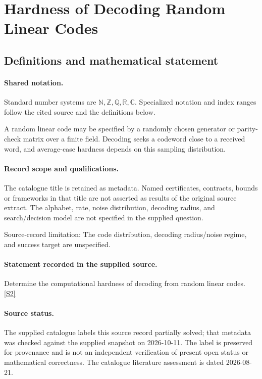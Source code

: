 \documentclass[11pt]{article}
\newcommand{\sref}[2]{\hyperlink{source:#1:#2}{[S#2]}}
\begin{document}
\section{Hardness of Decoding Random Linear Codes}\label{statement}

\subsection{Definitions and mathematical statement}

\paragraph{Shared notation.}Standard number systems are $\mathbb N,\mathbb Z,\mathbb Q,\mathbb R,\mathbb C$. Specialized notation and index ranges follow the cited source and the definitions below.


A random linear code may be specified by a randomly chosen generator or parity-check matrix over a finite field. Decoding seeks a codeword close to a received word, and average-case hardness depends on this sampling distribution.
\paragraph{Record scope and qualifications.}
The catalogue title is retained as metadata. Named certificates, contracts, bounds or frameworks in that title are not asserted as results of the original source extract.
The alphabet, rate, noise distribution, decoding radius, and search/decision model are not specified in the supplied question.

Source-record limitation: The code distribution, decoding radius/noise regime, and success target are unspecified.
\paragraph{Statement recorded in the supplied source.}
Determine the computational hardness of decoding from random linear codes. \sref{statement}{2}
\paragraph{Source status.}
The supplied catalogue labels this source record partially solved; that metadata was checked against the supplied snapshot on 2026-10-11. The label is preserved for provenance and is not an independent verification of present open status or mathematical correctness. The catalogue literature assessment is dated 2026-08-21.
\end{document}
